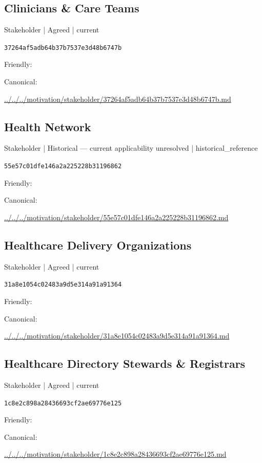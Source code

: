 \documentclass[10pt,a4paper]{article}
\begin{document}
\subsection*{Clinicians \& Care Teams}
{\small Stakeholder | Agreed | current}\par
\texttt{37264af5adb64b37b7537e3d48b6747b}\par
Friendly: \par
Canonical: \par
{\footnotesize\url{../../../motivation/stakeholder/37264af5adb64b37b7537e3d48b6747b.md}}\par
\subsection*{Health Network}
{\small Stakeholder | Historical — current applicability unresolved | historical\_reference}\par
\texttt{55e57c01dfe146a2a225228b31196862}\par
Friendly: \par
Canonical: \par
{\footnotesize\url{../../../motivation/stakeholder/55e57c01dfe146a2a225228b31196862.md}}\par
\subsection*{Healthcare Delivery Organizations}
{\small Stakeholder | Agreed | current}\par
\texttt{31a8e1054c02483a9d5e314a91a91364}\par
Friendly: \par
Canonical: \par
{\footnotesize\url{../../../motivation/stakeholder/31a8e1054c02483a9d5e314a91a91364.md}}\par
\subsection*{Healthcare Directory Stewards \& Registrars}
{\small Stakeholder | Agreed | current}\par
\texttt{1c8e2c898a28436693cf2ae69776e125}\par
Friendly: \par
Canonical: \par
{\footnotesize\url{../../../motivation/stakeholder/1c8e2c898a28436693cf2ae69776e125.md}}\par
\end{document}
